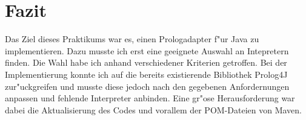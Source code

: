 
\section{Fazit}
Das Ziel dieses Praktikums war es, einen Prologadapter f"ur Java zu implementieren. Dazu musste ich erst eine geeignete Auswahl an Intepretern finden. Die Wahl habe ich anhand verschiedener Kriterien getroffen. Bei der Implementierung konnte ich auf die bereits existierende Bibliothek Prolog4J zur"uckgreifen und musste diese jedoch nach den gegebenen Anfordernungen anpassen und fehlende Interpreter anbinden. Eine gr"ose Herausforderung war dabei die Aktualisierung des Codes und vorallem der POM-Dateien von Maven.\newpage